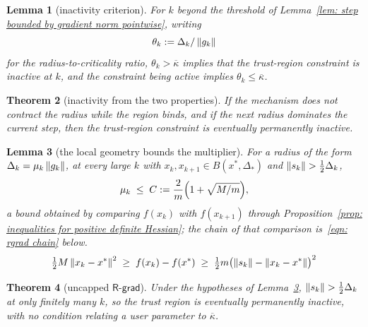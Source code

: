 \documentclass[11pt]{article}
\theoremstyle{plain}
\newtheorem{theorem}{Theorem}[section]
\newtheorem{lemma}[theorem]{Lemma}
\theoremstyle{definition}
\theoremstyle{remark}
\numberwithin{equation}{section}
\providecommand{\defeq}{\mathrel{:=}}
\newcommand{\Rgrad}{\textsf{R-grad}}
\providecommand{\kbar}{\overline{\kappa}}
\providecommand{\kbar}{\overline{\kappa}}
\begin{document}
\begin{lemma}[inactivity criterion]
\label{lem: inactivity criterion}
    For $k$ beyond the threshold of
    Lemma~\ref{lem: step bounded by gradient norm pointwise}, writing
    \begin{equation}
        \theta_k \defeq \Delta_k / \norm{g_k}
        \label{eqn: theta}
    \end{equation}
    for the radius-to-criticality ratio, $\theta_k > \kbar$ implies that the
    trust-region constraint is inactive at $k$, and the constraint being active
    implies $\theta_k \leq \kbar$.
\end{lemma}

\begin{theorem}[inactivity from the two properties]
\label{thm: trust-region radius becomes inactive}
    If the mechanism does not contract the radius while the region binds, and if
    the next radius dominates the current step, then the trust-region constraint
    is eventually permanently inactive.
\end{theorem}

\begin{lemma}[the local geometry bounds the multiplier]
\label{lem: mu at expansion}
    For a radius of the form $\Delta_k = \mu_k\left \lVert g_k \right \rVert$, at every large $k$ with
    $x_k, x_{k+1} \in B(x^*,\Delta_*)$ and $\left \lVert s_k \right \rVert > \tfrac12\Delta_k$,
    \begin{equation}
        \mu_k \;\leq\; C \defeq \frac{2}{m}\Bigl(1 + \sqrt{M/m}\Bigr) ,
        \label{eqn: mu ceiling}
    \end{equation}
    a bound obtained by comparing $f(x_k)$ with $f(x_{k+1})$ through
    Proposition~\ref{prop: inequalities for positive definite Hessian}; the chain
    of that comparison is~\eqref{eqn: rgrad chain} below.
    \begin{equation}
        \tfrac12 M\left \lVert x_k-x^* \right \rVert^2 \;\geq\; f(x_k) - f(x^*) \;\geq\;
        \tfrac12 m\bigl(\left \lVert s_k \right \rVert - \left \lVert x_k-x^* \right \rVert\bigr)^2
        \label{eqn: rgrad chain}
    \end{equation}
\end{lemma}

\begin{theorem}[uncapped $\Rgrad$]
\label{thm: rgrad uncapped}
    Under the hypotheses of Lemma~\ref{lem: mu at expansion},
    $\left \lVert s_k \right \rVert > \tfrac12\Delta_k$ at only finitely many $k$, so the trust region
    is eventually permanently inactive, with no condition relating a user
    parameter to $\kbar$.
\end{theorem}
\end{document}
